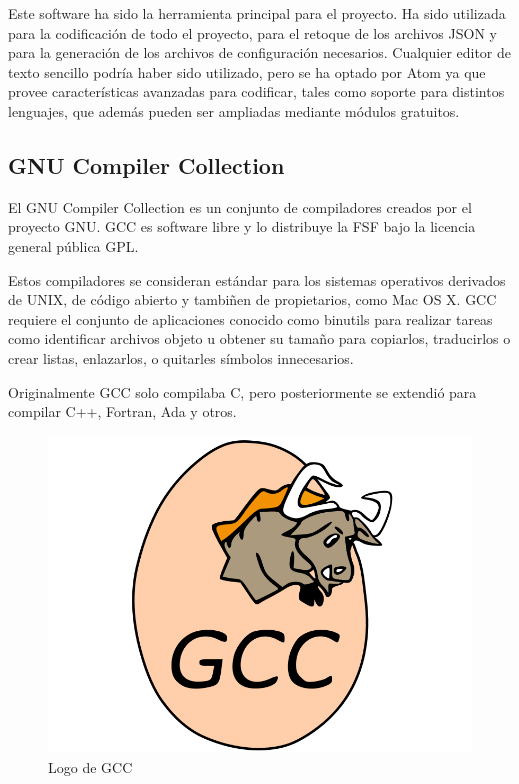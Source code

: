 		Este software ha sido la herramienta principal para el proyecto. Ha sido utilizada para la codificación de todo el proyecto, para el retoque de los archivos JSON y para la generación de los archivos de configuración necesarios. Cualquier editor de texto sencillo podría haber sido utilizado, pero se ha optado por Atom ya que provee características avanzadas para codificar, tales como soporte para distintos lenguajes, que además pueden ser ampliadas mediante módulos gratuitos.

	\subsection{GNU Compiler Collection}

		El GNU Compiler Collection es un conjunto de compiladores creados por el proyecto GNU. GCC es software libre y lo distribuye la FSF bajo la licencia general pública GPL.

		Estos compiladores se consideran estándar para los sistemas operativos derivados de UNIX, de código abierto y tambiñen de propietarios, como Mac OS X. GCC requiere el conjunto de aplicaciones conocido como binutils para realizar tareas como identificar archivos objeto u obtener su tamaño para copiarlos, traducirlos o crear listas, enlazarlos, o quitarles símbolos innecesarios.

		Originalmente GCC solo compilaba C, pero posteriormente se extendió para compilar C++, Fortran, Ada y otros.

		\begin{figure}[!htp]
			 \centering
			 \includegraphics{fig/gcc}
			 \caption{Logo de GCC}
			 \label{fig:gcc}
		\end{figure}

